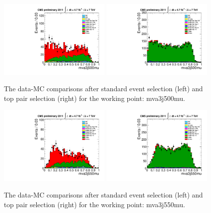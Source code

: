 \begin{figure}[!t]
  \centering
  \includegraphics[width=0.49\textwidth]{figs/cl-mva3j500mu-normal.pdf}
  \includegraphics[width=0.49\textwidth]{figs/cl-mva3j500mu-inTTbar.pdf}
  \caption{\label{fig:mva:plots-mva3j500mu} The data-MC comparisons
    after standard event selection (left) and top pair
    selection (right) for the working point: mva3j500mu.}
\end{figure}

\begin{figure}[!t]
  \centering
  \includegraphics[width=0.49\textwidth]{figs/cl-mva3j550mu-normal.pdf}
  \includegraphics[width=0.49\textwidth]{figs/cl-mva3j550mu-inTTbar.pdf}
  \caption{\label{fig:mva:plots-mva3j550mu} The data-MC comparisons
    after standard event selection (left) and top pair
    selection (right) for the working point: mva3j550mu.}
\end{figure}

